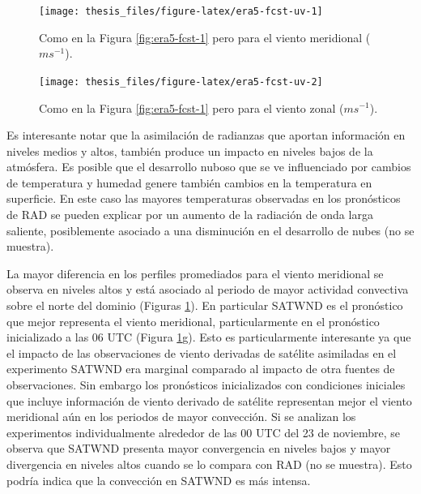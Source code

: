 \documentclass[12pt,oneside,a4paper]{reedthesis}
\begin{document}
\begin{figure}[ht]

{\centering \texttt{[image: thesis\_files/figure-latex/era5-fcst-uv-1]} 

}

\caption{Como en la Figura \ref{fig:era5-fcst-1} pero para el viento meridional (\(ms^{-1}\)).}\label{fig:era5-fcst-uv-1}
\end{figure}
\begin{figure}[ht]

{\centering \texttt{[image: thesis\_files/figure-latex/era5-fcst-uv-2]} 

}

\caption{Como en la Figura \ref{fig:era5-fcst-1} pero para el viento zonal (\(ms^{-1}\)).}\label{fig:era5-fcst-uv-2}
\end{figure}
Es interesante notar que la asimilación de radianzas que aportan información en niveles medios y altos, también produce un impacto en niveles bajos de la atmósfera. Es posible que el desarrollo nuboso que se ve influenciado por cambios de temperatura y humedad genere también cambios en la temperatura en superficie. En este caso las mayores temperaturas observadas en los pronósticos de RAD se pueden explicar por un aumento de la radiación de onda larga saliente, posiblemente asociado a una disminución en el desarrollo de nubes (no se muestra).

La mayor diferencia en los perfiles promediados para el viento meridional se observa en niveles altos y está asociado al periodo de mayor actividad convectiva sobre el norte del dominio (Figuras \ref{fig:era5-fcst-uv-1}). En particular SATWND es el pronóstico que mejor representa el viento meridional, particularmente en el pronóstico inicializado a las 06 UTC (Figura \ref{fig:era5-fcst-uv-1}g). Esto es particularmente interesante ya que el impacto de las observaciones de viento derivadas de satélite asimiladas en el experimento SATWND era marginal comparado al impacto de otra fuentes de observaciones. Sin embargo los pronósticos inicializados con condiciones iniciales que incluye información de viento derivado de satélite representan mejor el viento meridional aún en los periodos de mayor convección. Si se analizan los experimentos individualmente alrededor de las 00 UTC del 23 de noviembre, se observa que SATWND presenta mayor convergencia en niveles bajos y mayor divergencia en niveles altos cuando se lo compara con RAD (no se muestra). Esto podría indica que la convección en SATWND es más intensa.
\end{document}
